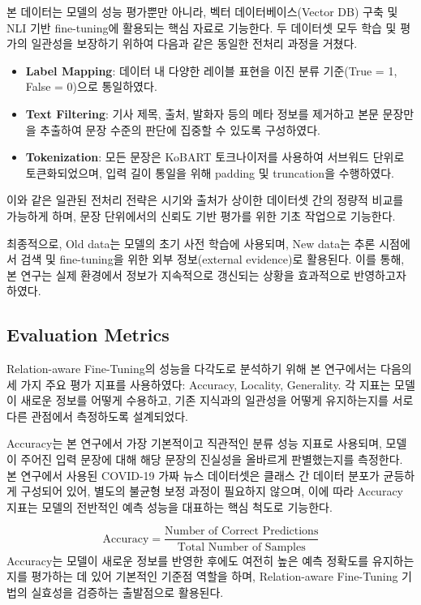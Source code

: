 \documentclass[a4paper,fleqn]{cas-sc}
\begin{document}
본 데이터는 모델의 성능 평가뿐만 아니라, 벡터 데이터베이스(Vector DB) 구축 및 NLI 기반 fine-tuning에 활용되는 핵심 자료로 기능한다.
두 데이터셋 모두 학습 및 평가의 일관성을 보장하기 위하여 다음과 같은 동일한 전처리 과정을 거쳤다.

\begin{itemize}
    \item{\textbf{Label Mapping}:
    데이터 내 다양한 레이블 표현을 이진 분류 기준(True = 1, False = 0)으로 통일하였다.}
    \item{\textbf{Text Filtering}:
    기사 제목, 출처, 발화자 등의 메타 정보를 제거하고 본문 문장만을 추출하여 문장 수준의 판단에 집중할 수 있도록 구성하였다.}
    \item{\textbf{Tokenization}: 
    모든 문장은 KoBART 토크나이저를 사용하여 서브워드 단위로 토큰화되었으며, 입력 길이 통일을 위해 padding 및 truncation을 수행하였다.
    }
\end{itemize}  

이와 같은 일관된 전처리 전략은 시기와 출처가 상이한 데이터셋 간의 정량적 비교를 가능하게 하며, 문장 단위에서의 신뢰도 기반 평가를 위한 기초 작업으로 기능한다.

최종적으로, Old data는 모델의 초기 사전 학습에 사용되며, New data는 추론 시점에서 검색 및 fine-tuning을 위한 외부 정보(external evidence)로 활용된다. 이를 통해, 본 연구는 실제 환경에서 정보가 지속적으로 갱신되는 상황을 효과적으로 반영하고자 하였다.

\subsection{Evaluation Metrics}

Relation-aware Fine-Tuning의 성능을 다각도로 분석하기 위해 본 연구에서는 다음의 세 가지 주요 평가 지표를 사용하였다: Accuracy, Locality, Generality. 각 지표는 모델이 새로운 정보를 어떻게 수용하고, 기존 지식과의 일관성을 어떻게 유지하는지를 서로 다른 관점에서 측정하도록 설계되었다. 

Accuracy는 본 연구에서 가장 기본적이고 직관적인 분류 성능 지표로 사용되며, 모델이 주어진 입력 문장에 대해 해당 문장의 진실성을 올바르게 판별했는지를 측정한다. 본 연구에서 사용된 COVID-19 가짜 뉴스 데이터셋은 클래스 간 데이터 분포가 균등하게 구성되어 있어, 별도의 불균형 보정 과정이 필요하지 않으며, 이에 따라 Accuracy 지표는 모델의 전반적인 예측 성능을 대표하는 핵심 척도로 기능한다.

\begin{equation}
    \text{Accuracy} = \frac{\text{Number of Correct Predictions}}{\text{Total Number of Samples}}
\end{equation}
Accuracy는 모델이 새로운 정보를 반영한 후에도 여전히 높은 예측 정확도를 유지하는지를 평가하는 데 있어 기본적인 기준점 역할을 하며, Relation-aware Fine-Tuning 기법의 실효성을 검증하는 출발점으로 활용된다.
\end{document}
